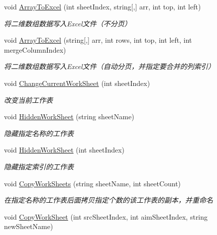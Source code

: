 \begin{DoxyCompactItemize}
void \hyperlink{class_x_c_l_net_tools_1_1_data_handler_1_1_excel_helper_a7f91871b4a54529f34b3b95fd0c9f0e9}{Array\-To\-Excel} (int sheet\-Index, string\mbox{[},\mbox{]} arr, int top, int left)
\begin{DoxyCompactList}\small\item\em 将二维数组数据写入\-Excel文件（不分页） \end{DoxyCompactList}\item 
void \hyperlink{class_x_c_l_net_tools_1_1_data_handler_1_1_excel_helper_a24dc63cd234dd2bc58a5833b4dcdcc6e}{Array\-To\-Excel} (string\mbox{[},\mbox{]} arr, int rows, int top, int left, int merge\-Column\-Index)
\begin{DoxyCompactList}\small\item\em 将二维数组数据写入\-Excel文件（自动分页，并指定要合并的列索引） \end{DoxyCompactList}\item 
void \hyperlink{class_x_c_l_net_tools_1_1_data_handler_1_1_excel_helper_a5685e97d3cfd67203faeee2bcdd6c788}{Change\-Current\-Work\-Sheet} (int sheet\-Index)
\begin{DoxyCompactList}\small\item\em 改变当前工作表 \end{DoxyCompactList}\item 
void \hyperlink{class_x_c_l_net_tools_1_1_data_handler_1_1_excel_helper_a417d5331a647da31429ff028821e4012}{Hidden\-Work\-Sheet} (string sheet\-Name)
\begin{DoxyCompactList}\small\item\em 隐藏指定名称的工作表 \end{DoxyCompactList}\item 
void \hyperlink{class_x_c_l_net_tools_1_1_data_handler_1_1_excel_helper_a2b65f3492d6d7eeadd2366db1d1cc992}{Hidden\-Work\-Sheet} (int sheet\-Index)
\begin{DoxyCompactList}\small\item\em 隐藏指定索引的工作表 \end{DoxyCompactList}\item 
void \hyperlink{class_x_c_l_net_tools_1_1_data_handler_1_1_excel_helper_a3aa2c1a6e359f9fe7bba76d803ecbb81}{Copy\-Work\-Sheets} (string sheet\-Name, int sheet\-Count)
\begin{DoxyCompactList}\small\item\em 在指定名称的工作表后面拷贝指定个数的该工作表的副本，并重命名 \end{DoxyCompactList}\item 
void \hyperlink{class_x_c_l_net_tools_1_1_data_handler_1_1_excel_helper_a8947f0bbcbbd82566e9083fd30965862}{Copy\-Work\-Sheet} (int src\-Sheet\-Index, int aim\-Sheet\-Index, string new\-Sheet\-Name)

\end{DoxyCompactItemize}
